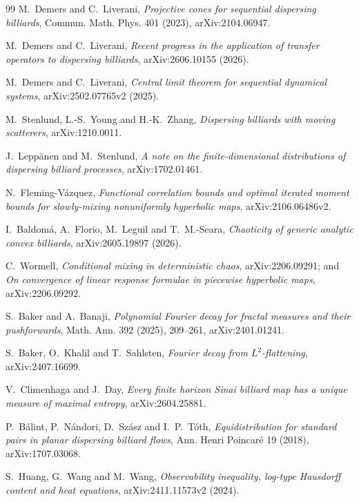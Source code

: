 \documentclass[11pt]{article}
\begin{document}
\begingroup\raggedright
\begin{thebibliography}{99}
M.~Demers and C.~Liverani,
\emph{Projective cones for sequential dispersing billiards},
Commun. Math. Phys. 401 (2023), arXiv:2104.06947.

M.~Demers and C.~Liverani,
\emph{Recent progress in the application of transfer operators to dispersing
billiards}, arXiv:2606.10155 (2026).

M.~Demers and C.~Liverani,
\emph{Central limit theorem for sequential dynamical systems},
arXiv:2502.07765v2 (2025).

M.~Stenlund, L.-S.~Young and H.-K.~Zhang,
\emph{Dispersing billiards with moving scatterers},
arXiv:1210.0011.

J.~Lepp\"anen and M.~Stenlund,
\emph{A note on the finite-dimensional distributions of dispersing billiard processes},
arXiv:1702.01461.

N.~Fleming-V\'azquez,
\emph{Functional correlation bounds and optimal iterated moment bounds for
slowly-mixing nonuniformly hyperbolic maps}, arXiv:2106.06486v2.

I.~Baldom\'a, A.~Florio, M.~Leguil and T.~M.-Seara,
\emph{Chaoticity of generic analytic convex billiards},
arXiv:2605.19897 (2026).

C.~Wormell,
\emph{Conditional mixing in deterministic chaos},
arXiv:2206.09291; and
\emph{On convergence of linear response formulae in piecewise hyperbolic maps},
arXiv:2206.09292.

S.~Baker and A.~Banaji,
\emph{Polynomial Fourier decay for fractal measures and their pushforwards},
Math. Ann. 392 (2025), 209--261, arXiv:2401.01241.

S.~Baker, O.~Khalil and T.~Sahlsten,
\emph{Fourier decay from $L^2$-flattening},
arXiv:2407.16699.

V.~Climenhaga and J.~Day,
\emph{Every finite horizon Sinai billiard map has a unique measure of maximal entropy},
arXiv:2604.25881.

P.~B\'alint, P.~N\'andori, D.~Sz\'asz and I.~P.~T\'oth,
\emph{Equidistribution for standard pairs in planar dispersing billiard flows},
Ann. Henri Poincar\'e 19 (2018), arXiv:1707.03068.

S.~Huang, G.~Wang and M.~Wang,
\emph{Observability inequality, log-type Hausdorff content and heat equations},
arXiv:2411.11573v2 (2024).


\end{thebibliography}
\end{document}
